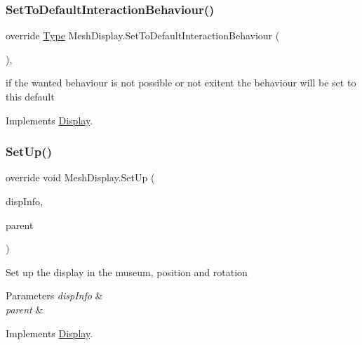 \subsubsection{\texorpdfstring{Set\+To\+Default\+Interaction\+Behaviour()}{SetToDefaultInteractionBehaviour()}}
{\footnotesize\ttfamily override \mbox{\hyperlink{class_display_a2c80ba13fff1fd81aaa6915b28e8c14f}{Type}} Mesh\+Display.\+Set\+To\+Default\+Interaction\+Behaviour (\begin{DoxyParamCaption}{ }\end{DoxyParamCaption})\hspace{0.3cm}{\ttfamily [protected]}, {\ttfamily [virtual]}}



if the wanted behaviour is not possible or not exitent the behaviour will be set to this default 



Implements \mbox{\hyperlink{class_display_a81f07350cf50b3924f4fe269e1b4cf17}{Display}}.

\mbox{\label{class_mesh_display_adb19ca4d076a93df64d1c035663fce0f}} 
\subsubsection{\texorpdfstring{Set\+Up()}{SetUp()}}
{\footnotesize\ttfamily override void Mesh\+Display.\+Set\+Up (\begin{DoxyParamCaption}\item[{\mbox{\hyperlink{class_museum_display_info}{Museum\+Display\+Info}}}]{disp\+Info,  }\item[{Game\+Object}]{parent }\end{DoxyParamCaption})\hspace{0.3cm}{\ttfamily [virtual]}}



Set up the display in the museum, position and rotation 


\begin{DoxyParams}{Parameters}
{\em disp\+Info} & \\
\hline
{\em parent} & \\
\hline
\end{DoxyParams}


Implements \mbox{\hyperlink{class_display_a57325251fbeac943cd48520e50f0bec4}{Display}}.

